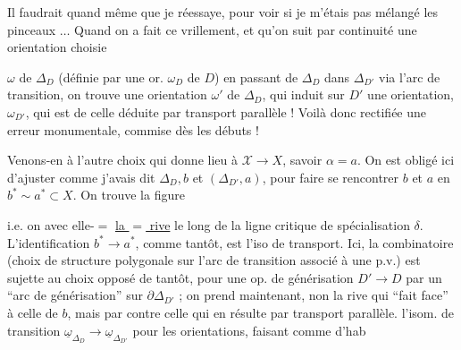  Il faudrait quand même que je réessaye, pour voir si je  m'étais pas mélangé les pinceaux $\ldots$  Quand on a fait ce vrillement, et qu'on suit par continuité une orientation choisie

$\omega$ de $\Delta_D$ (définie par une or. $\omega_D$ de $D$) en passant de $\Delta_D$ dans $\Delta_{D'}$ via l'arc de transition, on trouve  une orientation $\omega'$ de $\Delta_D$, qui induit sur $D'$ une orientation, $\omega_{D'}$, qui est  de celle déduite par transport  parallèle ! Voilà donc rectifiée une erreur monumentale, commise dès les débuts !

Venons-en à l'autre choix qui donne lieu à $\mathscr X\to X$, savoir $\alpha=a$. On est obligé ici d'ajuster comme j'avais dit $\Delta_D,b$ et $(\Delta_{D'},a)$, pour faire se rencontrer $b$ et $a$ en $b^*\sim a^*\subset X$. On trouve la figure


i.e. on  avec elle-\ensuremath{=} \uline{la $=$ rive}  le long de la ligne critique de spécialisation $\delta$. L'identification $b^*\to a^*$, comme tantôt, est l'iso de transport. Ici, la combinatoire (choix  de structure polygonale sur l'arc de transition associé à une p.v.) est sujette au choix opposé
de tantôt, pour  une op. de générisation $D'\longrightarrow D$ par un ``arc de générisation'' sur $\partial\Delta_{D'}$ ; on prend maintenant, non la rive qui ``fait face'' à celle de $b$, mais par contre celle qui en résulte par transport parallèle.   l'isom. de transition $\underline{\omega}_{\Delta_D}\longrightarrow\underline{\omega}_{\Delta_{D'}}$ pour les orientations, faisant comme d'hab

